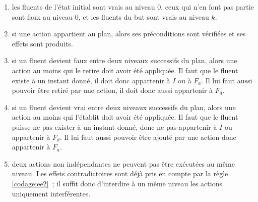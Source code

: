 {\begin{enumerate}
\item {} les fluents de l'état initial sont vrais au
  niveau $0$, ceux qui n'en font pas partie sont faux au niveau $0$, et les
  fluents du but sont vrais au niveau $k$.
\item \label{codage:ee2}  si une
  action appartient au plan, alors ses préconditions sont vérifiées et
  ses effets sont produits.
\item \label{codage:ee3}  si un
  fluent devient faux entre deux niveaux successifs du plan, alors une action au
  moins qui le retire doit avoir été appliquée. Il faut que le fluent existe à
  un instant donné, il doit donc appartenir à $I$ ou à $F_a$. Il lui faut aussi
  pouvoir être retiré par une action, il doit donc aussi appartenir à $F_d$.
\item \label{codage:ee4}  si un
  fluent devient vrai entre deux niveaux successifs du plan, alors une action au
  moins qui l'établit doit avoir été appliquée.  Il faut que le fluent puisse ne
  pas exister à un instant donné, donc ne pas appartenir à $I$ ou appartenir à
  $F_d$. Il lui faut aussi pouvoir être ajouté par une action donc appartenir à
  $F_a$.
\item \label{codage:ee5}  deux actions non
  indépendantes ne peuvent pas être exécutées au même niveau. Les effets
  contradictoires sont déjà pris en compte par la règle \ref{codage:ee2}~; il
  suffit donc d'interdire à un même niveau les actions uniquement interférentes.
\end{enumerate}

}